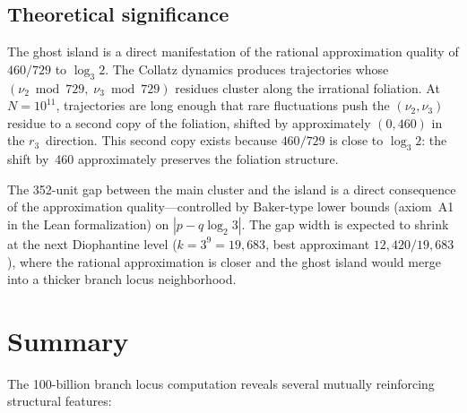 \documentclass[11pt]{article}
\begin{document}
\subsection{Theoretical significance}

The ghost island is a direct manifestation of the rational
approximation quality of $460/729$ to $\log_3 2$.  The Collatz
dynamics produces trajectories whose $(\nu_2 \bmod 729,\;
\nu_3 \bmod 729)$ residues cluster along the irrational foliation.
At $N = 10^{11}$, trajectories are long enough that rare
fluctuations push the $(\nu_2, \nu_3)$ residue to a second copy of
the foliation, shifted by approximately $(0, 460)$ in the
$r_3$~direction.  This second copy exists because $460/729$ is close
to $\log_3 2$: the shift by~460 approximately preserves the foliation
structure.

The 352-unit gap between the main cluster and the island is a
direct consequence of the approximation quality---controlled by
Baker-type lower bounds (axiom~A1 in the Lean formalization) on
$|p - q \log_2 3|$.  The gap width is expected to shrink at the
next Diophantine level ($k = 3^9 = 19{,}683$, best approximant
$12{,}420/19{,}683$), where the rational approximation is closer
and the ghost island would merge into a thicker branch locus
neighborhood.

\section{Summary}
\label{sec:summary}

The 100-billion branch locus computation reveals several mutually
reinforcing structural features:
\end{document}
